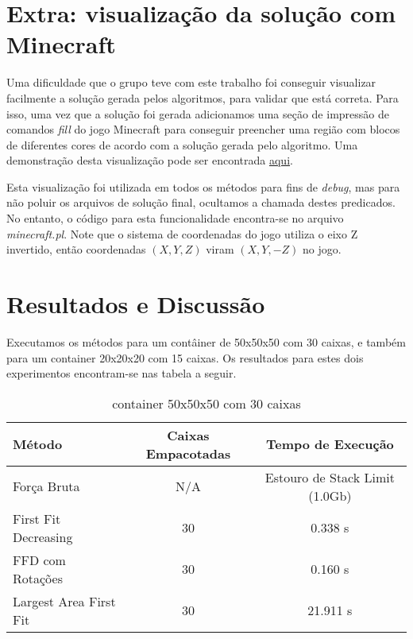 \documentclass[12pt]{article}
\begin{document}
\section{Extra: visualização da solução com Minecraft}

Uma dificuldade que o grupo teve com este trabalho foi conseguir visualizar facilmente a solução gerada pelos algoritmos, para validar que está correta. Para isso, uma vez que a solução foi gerada adicionamos uma seção de impressão de comandos \textit{fill} do jogo Minecraft para conseguir preencher uma região com blocos de diferentes cores de acordo com a solução gerada pelo algoritmo. Uma demonstração desta visualização pode ser encontrada \href{https://www.youtube.com/watch?v=qInZZb9y1dQ}{aqui}.

Esta visualização foi utilizada em todos os métodos para fins de \textit{debug}, mas para não poluir os arquivos de solução final, ocultamos a chamada destes predicados. No entanto, o código para esta funcionalidade encontra-se no arquivo \textit{minecraft.pl}. Note que o sistema de coordenadas do jogo utiliza o eixo Z invertido, então coordenadas $(X, Y, Z)$ viram $(X, Y, -Z)$ no jogo.

\section{Resultados e Discussão}

Executamos os métodos para um contâiner de 50x50x50 com 30 caixas, e também para um container 20x20x20 com 15 caixas. Os resultados para estes dois experimentos encontram-se nas tabela a seguir.

\begin{table}[H]
	\centering
	\caption{container 50x50x50 com 30 caixas}
	\begin{tabular}{lcc}
		\toprule
		\textbf{Método}        & \textbf{Caixas Empacotadas} & \textbf{Tempo de Execução}     \\
		\midrule
		Força Bruta            & N/A                         & Estouro de Stack Limit (1.0Gb) \\
		First Fit Decreasing   & 30                          & 0.338 s                        \\
		FFD com Rotações       & 30                          & 0.160 s                        \\
		Largest Area First Fit & 30                          & 21.911 s                       \\
		\bottomrule
	\end{tabular}
	\label{tab:resultados_50}
\end{table}
\end{document}

